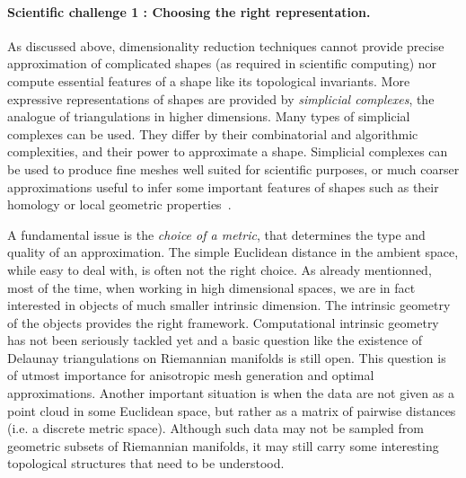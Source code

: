 \paragraph{Scientific challenge 1 :  Choosing the right representation.}


As discussed above, dimensionality reduction techniques cannot provide precise approximation of complicated shapes (as required in scientific computing) nor compute essential features of a shape like its topological invariants.
More expressive representations of shapes are provided %
by {\em simplicial complexes}, the analogue of triangulations in higher dimensions.
Many types of simplicial complexes can be used. They differ by their combinatorial and algorithmic complexities, and their power to approximate a shape.  Simplicial complexes can be used to produce fine meshes well suited for scientific purposes, or much coarser approximations useful to infer some important features of shapes such as their homology or local geometric properties~\cite{geometrica-7142i,geometrica-ccl09,nsw-fhm-2008}. 


A fundamental issue 
is  the {\em choice of a metric}, 
that determines the type and quality of an approximation.
 The simple Euclidean distance in the ambient space, while easy to deal with, is often not the right choice.  As already mentionned, most of the time, when working in high dimensional spaces, we are in fact interested in objects of much smaller intrinsic dimension. The intrinsic geometry of the objects provides the right framework. Computational intrinsic geometry has not been seriously tackled yet and a basic question like the existence of  Delaunay triangulations on Riemannian manifolds is still open.  This question is of utmost importance for anisotropic mesh generation and optimal approximations. Another important situation is when the data are not given as a point cloud in some Euclidean space, but rather as a matrix of pairwise distances (i.e. a discrete metric space). Although such data may not be sampled from geometric subsets of Riemannian manifolds, it may still carry some interesting topological structures that need to be understood. 

